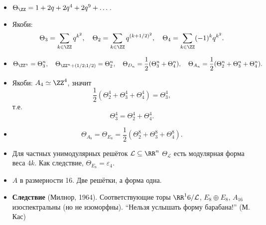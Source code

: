 \documentclass[12pt,a4paper]{article}
\begin{document}
    \begin{remark}
        \begin{itemize}
            \item $\Theta_{\ZZ} = 1 + 2q + 2q^4 + 2q^9 + \dots$.
            \item Якоби:
                \[
                    \Theta_3 = \sum_{k \in \ZZ} q^{k^2},
                    \quad
                    \Theta_2 = \sum_{k \in \ZZ} q^{(k + 1/2)^2},
                    \quad
                    \Theta_4 = \sum_{k \in \ZZ} (-1)^k q^{k^2}.
                \]
            \item
                \[
                    \Theta_{\ZZ^n} = \Theta_3^n,
                    \quad
                    \Theta_{\ZZ^n + (1/2; 1/2)} = \Theta_2^n,
                    \quad
                    \Theta_{D_n} = \frac{1}{2}(\Theta_3^n + \Theta_4^n),
                    \quad
                    \Theta_{A_n} = \frac{1}{2} (\Theta_2^n + \Theta_3^n + \Theta_4^n).
                \]
            \item Якоби: $A_4 \simeq \ZZ^4$, значит
                \[\frac{1}{2}(\Theta_2^4 + \Theta_3^4 + \Theta_4^4) = \Theta_3^4,\]
                т.е.
                \[\Theta_3^4 = \Theta_2^4 + \Theta_4^4.\]
            \item \[\Theta_{A_8} = \Theta_{E_8} = \frac{1}{2}(\Theta_2^8 + \Theta_3^8 + \Theta_4^8).\]
            \item Для частных унимодулярных решёток $\mathcal{L} \subseteq \RR^n$ $\Theta_{\mathcal{L}}$ есть модулярная форма веса $4k$. Как следствие, $\Theta_{E_8} = \varepsilon_4$.
            \item $A$ в размерности 16. Две решётки, а форма одна.
            \item \textbf{Следствие} (Милнор, 1964). Соответствующие торы $\RR^16/\mathcal{L}$, $E_8 \oplus E_8$, $A_16$ изоспектральны (но не изоморфны). ``Нельзя услышать форму барабана!'' (М. Кас)
        \end{itemize}
    \end{remark}
\end{document}
